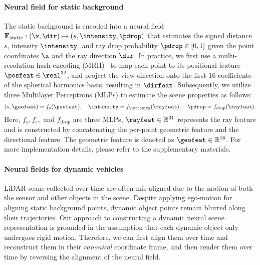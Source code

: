 \paragraph{Neural field for static background} 
The static background is encoded into a neural field $\mathbf{F}_\text{static}: (\x, \dir) \mapsto (s, \intensity, \pdrop)$ that estimates the signed distance $s$, intensity $\intensity$, and ray drop probability $\pdrop \in [0,1]$ given the point coordinates $\x$ and the ray direction $\dir$. In practice, we first use a multi-resolution hash encoding (MRH)~\cite{mueller2022instant} to map each point to its positional feature $\posfeat \in \real^{32}$, and project the view direction onto the first 16 coefficients of the spherical harmonics basis, resulting in $\dirfeat$. Subsequently, we utilize three Multilayer Perceptrons (MLPs) to estimate the scene properties as follows:
\begin{equation}
(s, \geofeat) = f_s(\posfeat), \quad \intensity = f_{\intensity}(\rayfeat), \quad \pdrop = f_{\text{drop}}(\rayfeat).
\end{equation}
Here, $f_s, f_e,$ and $f_{\text{drop}}$ are three MLPs, $\rayfeat \in \mathbb{R}^{31}$ represents the ray feature and is constructed by concatenating the per-point geometric feature and the directional feature. The geometric feature is denoted as $\geofeat \in \mathbb{R}^{16}$. For more implementation details, please refer to the supplementary materials. 




\paragraph{Neural fields for dynamic vehicles} 
LiDAR scans collected over time are often mis-aligned due to the motion of both the sensor and other objects in the scene. Despite applying ego-motion for aligning static background points, dynamic object points remain blurred along their trajectories. Our approach to constructing a dynamic neural scene representation is grounded in the assumption that each dynamic object only undergoes rigid motion. Therefore, we can first align them over time and reconstruct them in their \textit{canonical} coordinate frame, and then render them over time by reversing the alignment of the neural field.

